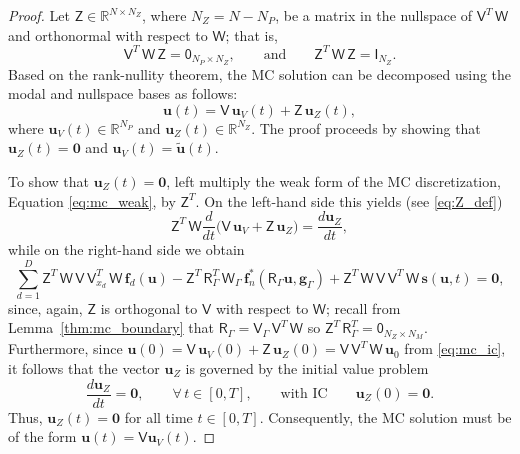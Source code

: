 \documentclass[pdflatex,sn-mathphys-num]{sn-jnl}%
\theoremstyle{thmstyleone}%
\theoremstyle{thmstyletwo}%
\theoremstyle{thmstylethree}%
\newcommand{\mat}[1]{\ensuremath{\mathsf{#1}}}
\begin{document}
\begin{proof}
Let $\mat{Z} \in \mathbb{R}^{N \times N_Z}$, where $N_Z = N -  N_P$, be a matrix in the nullspace of $\mat{V}^T \, \mat{W}$ and orthonormal with respect to $\mat{W}$; that is,
\begin{equation}\label{eq:Z_def}
    \mat{V}^T \, \mat{W} \, \mat{Z} = \mat{0}_{N_P \times N_Z},
    \qquad\text{and}\qquad
    \mat{Z}^T\, \mat{W} \, \mat{Z} = \mat{I}_{N_Z}.
\end{equation}
Based on the rank-nullity theorem, the MC solution can be decomposed using the modal and nullspace bases as follows:
\begin{equation*}
    \bm{u}(t) = \mat{V} \, \bm{u}_{V}(t) + \mat{Z}\, \bm{u}_Z(t),
\end{equation*}
where $\bm{u}_{V}(t) \in \mathbb{R}^{N_P}$ and $\bm{u}_Z(t) \in \mathbb{R}^{N_Z}$.  The proof proceeds by showing that $\bm{u}_Z(t) = \bm{0}$ and $\bm{u}_V(t) = \tilde{\bm{u}}(t)$.

To show that $\bm{u}_Z(t) = \bm{0}$, left multiply the weak form of the MC discretization, Equation \eqref{eq:mc_weak}, by $\mat{Z}^{T}$.  On the left-hand side this yields (see \eqref{eq:Z_def})
\begin{equation*}
\mat{Z}^{T}\, \mat{W} \frac{d}{dt} \big(\mat{V}\, \bm{u}_{V} + \mat{Z}\, \bm{u}_Z \big) = \frac{d \bm{u}_Z}{dt},
\end{equation*}
while on the right-hand side we obtain 
\begin{equation*}
\sum_{d=1}^D \mat{Z}^T \, \mat{W}\, \mat{V}\, \mat{V}_{x_d}^T\, \mat{W}\, \bm{f}_{d}(\bm{u}) - \mat{Z}^T\, \mat{R}_\Gamma^T\, \mat{W}_\Gamma\, \bm{f}_n^*(\mat{R}_\Gamma \bm{u}, \bm{g}_\Gamma) + \mat{Z}^T\, \mat{W}\, \mat{V}\, \mat{V}^T\, \mat{W}\, \bm{s}(\bm{u},t) = \bm{0},
\end{equation*}
since, again, $\mat{Z}$ is orthogonal to $\mat{V}$ with respect to $\mat{W}$; recall from Lemma~\ref{thm:mc_boundary} that $\mat{R}_\Gamma = \mat{V}_\Gamma \, \mat{V}^T \,\mat{W}$ so $\mat{Z}^T\,\mat{R}_\Gamma^T = \mat{0}_{N_Z \times N_M}$.  Furthermore, since $\bm{u}(0) = \mat{V}\, \bm{u}_V(0) + \mat{Z}\, \bm{u}_Z(0) = \mat{V} \, \mat{V}^T \,\mat{W} \,\bm{u}_0$ from \eqref{eq:mc_ic}, it follows that the vector $\bm{u}_{Z}$ is governed by the initial value problem 
\begin{equation*}
    \frac{d \bm{u}_Z}{dt} = \bm{0}, \qquad \forall\, t \in [0,T], 
    \qquad\text{with IC}\qquad \bm{u}_Z(0) = \bm{0}.
\end{equation*}
Thus, $\bm{u}_Z(t) = \bm{0}$ for all time $t \in [0,T]$.  Consequently, the MC solution must be of the form $\bm{u}(t) = \mat{V} \bm{u}_{V}(t)$.


\end{proof}
\end{document}

